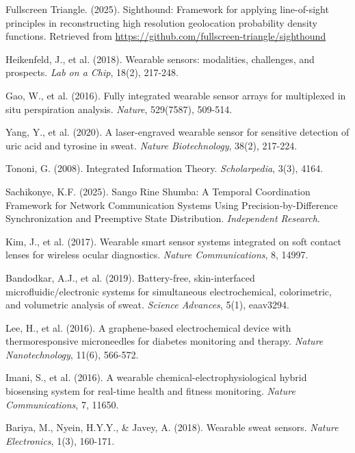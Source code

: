 \documentclass[12pt,a4paper]{article}
\begin{document}

\begin{thebibliography}{99}

Fullscreen Triangle. (2025). Sighthound: Framework for applying line-of-sight principles in reconstructing high resolution geolocation probability density functions. Retrieved from \url{https://github.com/fullscreen-triangle/sighthound}

Heikenfeld, J., et al. (2018). Wearable sensors: modalities, challenges, and prospects. \textit{Lab on a Chip}, 18(2), 217-248.

Gao, W., et al. (2016). Fully integrated wearable sensor arrays for multiplexed in situ perspiration analysis. \textit{Nature}, 529(7587), 509-514.

Yang, Y., et al. (2020). A laser-engraved wearable sensor for sensitive detection of uric acid and tyrosine in sweat. \textit{Nature Biotechnology}, 38(2), 217-224.

Tononi, G. (2008). Integrated Information Theory. \textit{Scholarpedia}, 3(3), 4164.

Sachikonye, K.F. (2025). Sango Rine Shumba: A Temporal Coordination Framework for Network Communication Systems Using Precision-by-Difference Synchronization and Preemptive State Distribution. \textit{Independent Research}.

Kim, J., et al. (2017). Wearable smart sensor systems integrated on soft contact lenses for wireless ocular diagnostics. \textit{Nature Communications}, 8, 14997.

Bandodkar, A.J., et al. (2019). Battery-free, skin-interfaced microfluidic/electronic systems for simultaneous electrochemical, colorimetric, and volumetric analysis of sweat. \textit{Science Advances}, 5(1), eaav3294.

Lee, H., et al. (2016). A graphene-based electrochemical device with thermoresponsive microneedles for diabetes monitoring and therapy. \textit{Nature Nanotechnology}, 11(6), 566-572.

Imani, S., et al. (2016). A wearable chemical-electrophysiological hybrid biosensing system for real-time health and fitness monitoring. \textit{Nature Communications}, 7, 11650.

Bariya, M., Nyein, H.Y.Y., & Javey, A. (2018). Wearable sweat sensors. \textit{Nature Electronics}, 1(3), 160-171.


\end{thebibliography}
\end{document}
